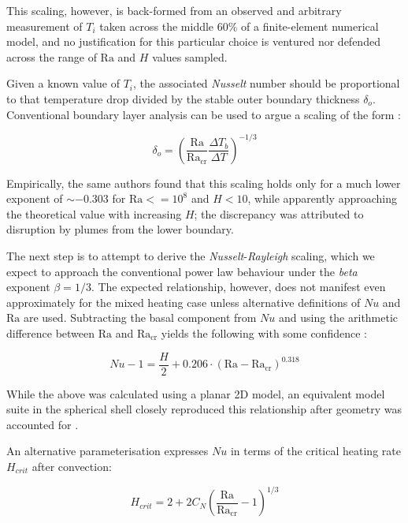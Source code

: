 \documentclass[a4paper,11pt,oneside]{book}
\begin{document}
This scaling, however, is back-formed from an observed and arbitrary measurement of $T_i$ taken across the middle 60\% of a finite-element numerical model, and no justification for this particular choice is ventured nor defended across the range of $\mathrm{Ra}$ and $H$ values sampled.

Given a known value of $T_i$, the associated \textit{Nusselt} number should be proportional to that temperature drop divided by the stable outer boundary thickness ${\delta}_o$. Conventional boundary layer analysis can be used to argue a scaling of the form \cite{Schubert2001-ea}:

\begin{equation}
{\delta}_o = {\left( \frac{\mathrm{Ra}}{{\mathrm{Ra}}_{\mathrm{cr}}} \frac{\Delta T_b}{\Delta T} \right)}^{-1/3}
\end{equation}

Empirically, the same authors \cite{Moore2008-je} found that this scaling holds only for a much lower exponent of $\sim -0.303$ for $\mathrm{Ra}<=10^8$ and $H<10$, while apparently approaching the theoretical value with increasing $H$; the discrepancy was attributed to disruption by plumes from the lower boundary.

The next step is to attempt to derive the \textit{Nusselt}-\textit{Rayleigh} scaling, which we expect to approach the conventional power law behaviour under the \textit{beta} exponent $\beta = 1/3$. The expected relationship, however, does not manifest even approximately for the mixed heating case unless alternative definitions of $Nu$ and $\mathrm{Ra}$ are used. Subtracting the basal component from $Nu$ and using the arithmetic difference between $\mathrm{Ra}$ and ${\mathrm{Ra}}_{\mathrm{cr}}$ yields the following with some confidence \cite{Moore2008-je}:

\begin{equation}
Nu - 1 = \frac{H}{2} + 0.206 \cdot {\left( \mathrm{Ra} - {\mathrm{Ra}}_{\mathrm{cr}} \right)}^{0.318}
\end{equation}

While the above was calculated using a planar 2D model, an equivalent model suite in the spherical shell closely reproduced this relationship after geometry was accounted for \cite{Weller2016-nm}.

An alternative parameterisation \cite{Vilella2018-il} expresses $Nu$ in terms of the critical heating rate $H_{crit}$ after convection:

\begin{equation}
H_{crit} = 2 + 2 C_N {\left( \frac{\mathrm{Ra}}{{\mathrm{Ra}}_{\mathrm{cr}}} - 1 \right)}^{1/3}
\end{equation}
\end{document}
